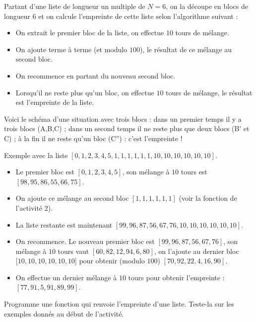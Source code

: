 \documentclass[11pt,class=report,crop=false]{standalone}
\begin{document}
\begin{activite}
\begin{enumerate}
   Partant d'une liste de longueur un multiple de $N=6$, on la découpe en blocs de longueur $6$ et on calcule l'empreinte de cette liste selon l'algorithme suivant :
   \begin{itemize}
     \item On extrait le premier bloc de la liste, on effectue $10$ tours de mélange.
     \item On ajoute terme à terme (et modulo $100$), le résultat de ce mélange au second bloc.
     \item On recommence en partant du nouveau second bloc.
     \item Lorsqu'il ne reste plus qu'un bloc, on effectue $10$ tours de mélange, le résultat est l'empreinte de la liste.
   \end{itemize}
 
 
Voici le schéma d'une situation avec trois blocs : dans un premier temps il y a trois blocs (A,B,C) ; dans un second temps il ne reste plus que deux blocs (B' et C) ; à la fin il ne reste qu'un bloc (C'') : c'est l'empreinte !
  
  
  Exemple avec la liste $[0,1,2,3,4,5,1,1,1,1,1,1,10,10,10,10,10,10]$.
  \begin{itemize}
    \item Le premier bloc est $[0,1,2,3,4,5]$, son mélange à $10$ tours est 
    $[98, 95, 86, 55, 66, 75]$. 
    \item On ajoute ce mélange au second bloc $[1,1,1,1,1,1]$ (voir la fonction  de l'activité 2).
    \item La liste restante est maintenant $[99,96,87,56,67,76,10,10,10,10,10,10]$.
    \item On recommence. Le nouveau premier bloc est $[99,96,87,56,67,76]$, son mélange à $10$ tours vaut $[60, 82, 12, 94, 6, 80]$, on l'ajoute au dernier bloc $[10,10,10,10,10,10$] pour obtenir (modulo $100$) $[70,92,22,4,16,90]$.
    \item On effectue un dernier mélange à $10$ tours pour obtenir l'empreinte : $[77, 91, 5, 91, 89, 99]$.
   \end{itemize}
   
   Programme une fonction  qui renvoie l'empreinte d'une liste.
     Teste-la sur les exemples donnés au début de l'activité.
\end{enumerate}   
     
\end{activite}
\end{document}
